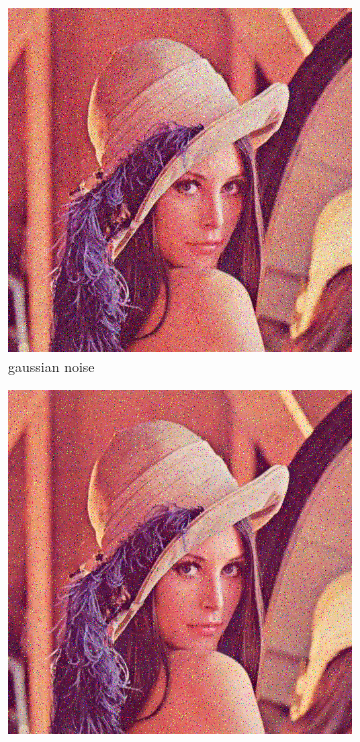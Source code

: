 \documentclass[12pt]{article}
\begin{document}
\begin{figure}[h]
\begin{subfigure}[t]{\subfiguresize}
        \includegraphics[width=\textwidth]{lenac_normal3.png}
        \caption{gaussian noise}
    \end{subfigure}
    \begin{subfigure}[t]{\subfiguresize}
        \includegraphics[width=\textwidth]{lenac_impulse3.png}

\end{subfigure}
\end{figure}
\end{document}
